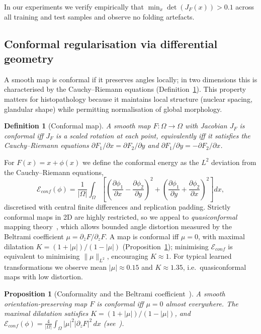 \documentclass[pdflatex,sn-nature]{sn-jnl}%
\theoremstyle{thmstyleone}%
\newtheorem{proposition}[theorem]{Proposition}%
\theoremstyle{thmstyletwo}%
\theoremstyle{thmstylethree}%
\newtheorem{definition}{Definition}%
\begin{document}
In our experiments we verify empirically that $\min_x\det(J_F(x))>0.1$ across all
training and test samples and observe no folding artefacts.

\subsection{Conformal regularisation via differential geometry}

A smooth map is conformal if it preserves angles locally; in two dimensions this
is characterised by the Cauchy--Riemann equations (Definition~\ref{def:conformal}).
This property matters for histopathology because it maintains local structure
(nuclear spacing, glandular shape) while permitting normalisation of global
morphology.

\begin{definition}[Conformal map]
\label{def:conformal}
A smooth map $F:\Omega\rightarrow\Omega$ with Jacobian $J_F$ is conformal iff
$J_F$ is a scaled rotation at each point, equivalently iff it satisfies the
Cauchy--Riemann equations
$\partial F_1/\partial x=\partial F_2/\partial y$ and
$\partial F_1/\partial y=-\partial F_2/\partial x$.
\end{definition}

For $F(x)=x+\phi(x)$ we define the conformal energy as the $L^2$ deviation from
the Cauchy--Riemann equations,
\begin{equation}
\mathcal{E}_{conf}(\phi)=\frac{1}{|\Omega|}\int_\Omega\left[\left(\frac{\partial\phi_1}{\partial x}-\frac{\partial\phi_2}{\partial y}\right)^2+\left(\frac{\partial\phi_1}{\partial y}+\frac{\partial\phi_2}{\partial x}\right)^2\right]dx,
\label{eq:conformal_energy}
\end{equation}
discretised with central finite differences and replication padding. Strictly
conformal maps in 2D are highly restricted, so we appeal to \textit{quasiconformal}
mapping theory~\cite{ahlfors2006conformal}, which allows bounded angle distortion
measured by the Beltrami coefficient $\mu=\partial_{\bar z}F/\partial_z F$. A map
is conformal iff $\mu=0$, with maximal dilatation $K=(1+|\mu|)/(1-|\mu|)$
(Proposition~\ref{prop:beltrami}); minimising $\mathcal{E}_{conf}$ is equivalent
to minimising $\|\mu\|_{L^2}$, encouraging $K\approx1$. For typical learned
transformations we observe mean $|\mu|\approx0.15$ and $K\approx1.35$, i.e.\
quasiconformal maps with low distortion.

\begin{proposition}[Conformality and the Beltrami coefficient~\cite{ahlfors2006conformal}]
\label{prop:beltrami}
A smooth orientation-preserving map $F$ is conformal iff $\mu=0$ almost
everywhere. The maximal dilatation satisfies $K=(1+|\mu|)/(1-|\mu|)$, and
$\mathcal{E}_{conf}(\phi)=\frac{4}{|\Omega|}\int_\Omega|\mu|^2|\partial_zF|^2\,dx$
(see~\cite{lui2014brain}).
\end{proposition}
\end{document}
